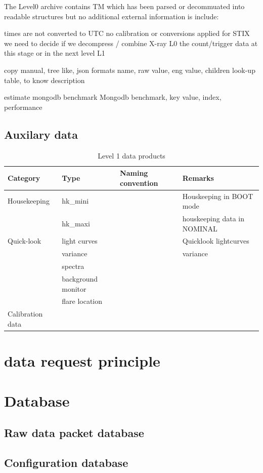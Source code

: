 \documentclass{aa}
\begin{document}
The Level0 archive contains TM which has been parsed or decommuated into readable structures but no additional external information is include:

times are not converted to UTC
no calibration or conversions applied
for STIX we need to decide if we decompress / combine X-ray L0 the count/trigger data at this stage or in the next level L1

copy manual,
tree like, 
json formats
name, raw value, eng value, children
look-up table, to know description

estimate mongodb benchmark
Mongodb benchmark,
key value, index, performance


\subsection{Auxilary data}



\begin{table}
\centering
\caption{Level 1 data products}
\begin{tabular}{llll}
Category & Type   &  Naming convention  & Remarks   \\ \hline
 Housekeeping & hk\_mini  &  & Houskeeping in BOOT mode   \\
 & hk\_maxi  &  & houskeeping data in NOMINAL   \\
 Quick-look &  light curves &  & Quicklook lightcurves \\
  &  variance &  & variance \\
  &  spectra &  &  \\
  &  background monitor &  &  \\
    &  flare location &  &  \\
 Calibration data &   &  &  \\
\end{tabular}
\end{table}
\section{data request principle}

\section{Database}
\subsection{Raw data packet database } 
\subsection{Configuration database}
\end{document}
